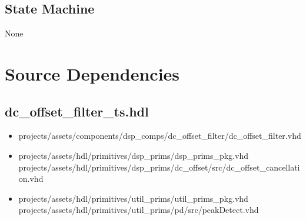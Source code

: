 \documentclass{article}
\def\comp{dc\_offset\_filter\_ts}
\begin{document}
\subsection*{State Machine}
None

\newpage

\section*{Source Dependencies}
\subsection*{\comp.hdl}
\begin{itemize}
	\item projects/assets/components/dsp\_comps/dc\_offset\_filter/dc\_offset\_filter.vhd
	\item projects/assets/hdl/primitives/dsp\_prims/dsp\_prims\_pkg.vhd
	     \subitem projects/assets/hdl/primitives/dsp\_prims/dc\_offset/src/dc\_offset\_cancellation.vhd
	\item projects/assets/hdl/primitives/util\_prims/util\_prims\_pkg.vhd
	      \subitem projects/assets/hdl/primitives/util\_prims/pd/src/peakDetect.vhd
\end{itemize}
\end{document}
